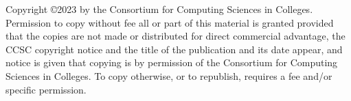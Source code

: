 Copyright \copyright 2023 by the Consortium for Computing Sciences in Colleges.
Permission to copy without fee all or part of this material is granted provided
that the copies are not made or distributed for direct commercial advantage,
the CCSC copyright notice and the title of the publication and its date appear,
and notice is given that copying is by permission of the Consortium for
Computing Sciences in Colleges.  To copy otherwise, or to republish, requires
a fee and/or specific permission.
